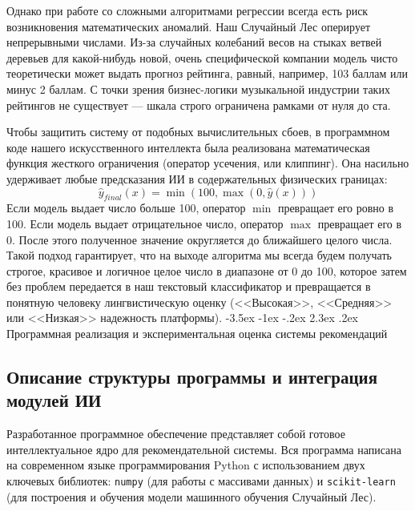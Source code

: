 \documentclass[14pt, a4paper]{extarticle}
\makeatletter
\renewcommand\section{\@startsection {section}{1}{\z@}%
 {-3.5ex \@plus -1ex \@minus -.2ex}%
 {2.3ex \@plus.2ex}%
{\centering\normalfont\Large\bfseries}}
\makeatother
\begin{document}
Однако при работе со сложными алгоритмами регрессии всегда есть риск возникновения математических аномалий. Наш Случайный Лес оперирует непрерывными числами. Из-за случайных колебаний весов на стыках ветвей деревьев для какой-нибудь новой, очень специфической компании модель чисто теоретически может выдать прогноз рейтинга, равный, например, 103 баллам или минус 2 баллам. С точки зрения бизнес-логики музыкальной индустрии таких рейтингов не существует — шкала строго ограничена рамками от нуля до ста.

Чтобы защитить систему от подобных вычислительных сбоев, в программном коде нашего искусственного интеллекта была реализована математическая функция жесткого ограничения (оператор усечения, или клиппинг). Она насильно удерживает любые предсказания ИИ в содержательных физических границах:
\begin{equation}\label{clipping_operator_simple}
\hat{y}_{final}(x) = \min\left(100, \max\left(0, \hat{y}(x)\right)\right)
\end{equation}
Если модель выдает число больше 100, оператор $\min$ превращает его ровно в 100. Если модель выдает отрицательное число, оператор $\max$ превращает его в 0. После этого полученное значение округляется до ближайшего целого числа. Такой подход гарантирует, что на выходе алгоритма мы всегда будем получать строгое, красивое и логичное целое число в диапазоне от 0 до 100, которое затем без проблем передается в наш текстовый классификатор и превращается в понятную человеку лингвистическую оценку (<<Высокая>>, <<Средняя>> или <<Низкая>> надежность платформы).
\newpage
\section{Программная реализация и экспериментальная оценка системы рекомендаций}

\subsection{Описание структуры программы и интеграция модулей ИИ}
Разработанное программное обеспечение представляет собой готовое интеллектуальное ядро для рекомендательной системы. Вся программа написана на современном языке программирования Python с использованием двух ключевых библиотек: \texttt{numpy} (для работы с массивами данных) и \texttt{scikit-learn} (для построения и обучения модели машинного обучения Случайный Лес).
\end{document}
